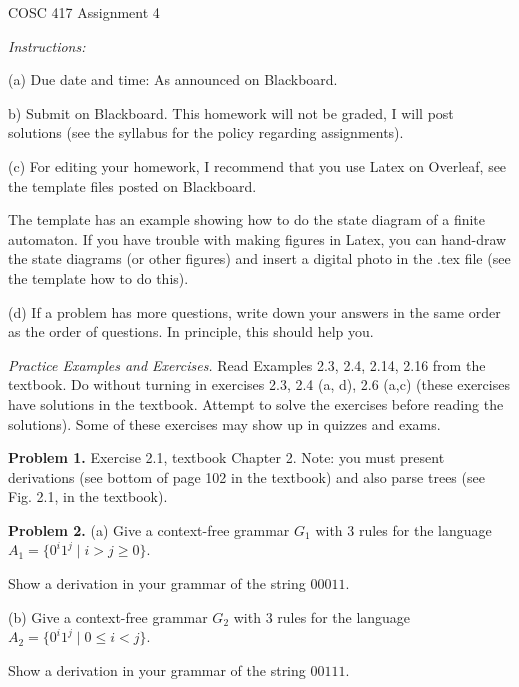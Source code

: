 \documentclass[11pt]{article}
\begin{document}
{\Large COSC 417 \hspace{2cm} Assignment 4}
\vspace{0.5cm}

\emph{Instructions:}

(a) Due date and time: As announced on Blackboard.


b) %
Submit on Blackboard.  This homework will not be graded, I will post solutions (see the syllabus for the policy regarding assignments).



(c) For editing your homework, I recommend that you use Latex on Overleaf, see the template files posted on Blackboard.

The template has an  example showing how to do the state diagram  of a finite automaton. If you have trouble with making figures in Latex, you can hand-draw the state diagrams (or other figures) and insert a digital photo in the .tex file (see the template how to do this).


(d) If a problem has more questions, write down your answers in the same order as the order of questions. In principle, this should help you.


\vspace{0.5cm}




\emph{Practice Examples and Exercises.}  Read Examples 2.3, 2.4, 2.14, 2.16 from the textbook. Do without turning in exercises 2.3, 2.4 (a, d), 2.6 (a,c) (these exercises have solutions in the textbook. Attempt to solve the exercises before reading the solutions).  Some of these exercises may  show up in quizzes and exams.
\bigskip

\textbf{Problem 1.}  Exercise 2.1, textbook Chapter 2. Note: you must present derivations (see bottom of page 102 in the textbook) and also parse trees (see  Fig. 2.1, in the textbook).
\bigskip

\textbf{Problem 2.}  (a)  Give a context-free grammar $G_1$ with $3$ rules  for the language $A_1 = \{0^i 1^j \mid i > j \geq 0\}$.

Show a derivation in your grammar of the string $00011$.
\smallskip

(b)  Give a context-free grammar $G_2$ with $3$ rules for the language $A_2 = \{0^i 1^j \mid 0 \leq  i < j\}$.

Show a derivation in your grammar of the string $00111$.

\smallskip
\end{document}
